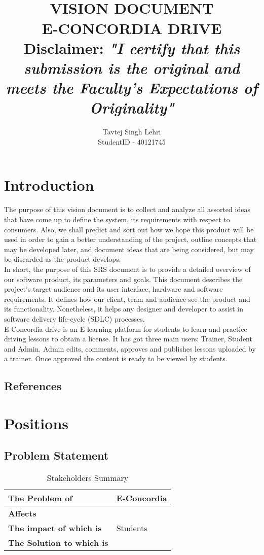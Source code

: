 \documentclass{article}
\title{\normalsize \texts{SOEN 6481 Summer 2021}\\ [1.0cm]
\large \textbf{\uppercase{Vision Document}}\\
\large \textbf{\uppercase{E-Concordia Drive}}
\normalsize \vspace*{2\baselineskip}\\
\textbf{Disclaimer:}
\textit{"I certify that this submission is the original and meets the Faculty's Expectations of Originality"}
}
\author{{Tavtej Singh Lehri}\\
{StudentID - 40121745}}
\begin{document}
\maketitle

\tableofcontents
\clearpage


\section{Introduction}
The purpose of this vision document is to collect and analyze all assorted ideas that have come up to define the system, its requirements with respect to consumers. Also, we shall predict and sort out how we hope this product will be used in order to gain a better understanding of the project, outline concepts that may be developed later, and document ideas that are being considered, but may be discarded as the product develops.\normalsize\vspace*{1\baselineskip}\\
In short, the purpose of this SRS document is to provide a detailed overview of our software product, its parameters and goals. This document describes the project's target audience and its user interface, hardware and software requirements. It defines how our client, team and audience see the product and its functionality. Nonetheless, it helps any designer and developer to assist in software delivery life-cycle (SDLC) processes.\normalsize\vspace*{1\baselineskip}\\
E-Concordia drive is an E-learning platform for students to learn and practice driving lessons to obtain a license. It has got three main users: Trainer, Student and Admin.
Admin edits, comments, approves and publishes  lessons uploaded by a trainer.
Once approved the content is ready to be viewed by students.

\subsection{References}


\section{Positions}

\subsection{Problem Statement}

\begin{table}[h!]
\begin{tabular}{|p{4.5cm}|p{11.5cm}|}
\hline
\textbf{The Problem of} & E-Concordia \\ \hline
\textbf{Affects}& \\ \hline
\textbf{The impact of which is} & Students\\ \hline
\textbf{The Solution to which is} & \\ \hline
\end{tabular}
\caption{Stakeholders Summary}
\label{table:1}
\end{table}
\end{document}
